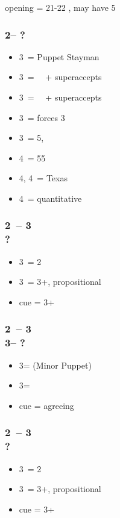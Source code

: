 \documentclass[12pt, a4paper]{report}
\begin{document}
{{        \alrts{2\nt} opening = 21-22 \bal, may have 5\major

        \subsubsection*{2\nt -- ?}
        \begin{itemize}
            \item 3\clubs\ = Puppet Stayman
            \item 3\diams\ = \then\ \hearts\ + superaccepts
            \item 3\hearts\ = \then\ \spades\ + superaccepts
            \item 3\spades\ = forces 3\nt
            \item 3\nt\ = 5\hearts, \nf \imp
            \item 4\clubs\ = 55\major
            \item 4\diams, 4\hearts\ = Texas
            \item 4\nt\ = quantitative
        \end{itemize}

        \subsubsection*{2\ntx\ -- 3\diams \\ ?}
        \begin{itemize}
            \item 3\hearts\ = 2\hearts
            \item 3\nt\ = 3+\hearts, propositional
            \item cue = 3+\hearts
        \end{itemize}

        \subsubsection*{2\ntx\ -- 3\diams \\
                        3\hearts -- ?}
        \begin{itemize}
            \item 3\spades = \nt (\then Minor Puppet)
            \item 3\nt = \spades \nat
            \item cue = agreeing \hearts
        \end{itemize}

        \subsubsection*{2\ntx\ -- 3\hearts \\ ?}
        \begin{itemize}
            \item 3\spades\ = 2\spades
            \item 3\nt\ = 3+\spades, propositional
            \item cue = 3+\spades
        \end{itemize}

}}
\end{document}
